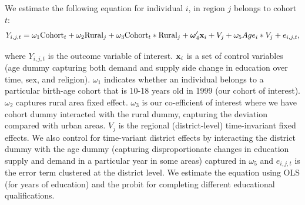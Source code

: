 \documentclass[12pt,letterpaper]{article}
\newcommand{\bfomega}{\ensuremath{\mbox{\boldmath $\omega$}}}
\newcommand{\bfx}{\ensuremath{\mbox{\bf x}}}
\newcommand{\0}{\ensuremath{\mbox{\boldmath $0$}}}
\begin{document}


We estimate the following equation for individual $i$, in region $j$ belongs to cohort $t$:
\begin{equation}
Y_{i,j,t} = \omega_{1}\textnormal{Cohort}_{t}+
\omega_{2}\textnormal{Rural}_{j}+ \omega_{3}\textnormal{Cohort}_{t}*\textnormal{Rural}_{j}+
\bfomega'_{4}\bfx_{i}+V_{j}+\omega_{5}Age_{i}*{V}_{j}+e_{i,j,t},
\label{longruneqn}
\end{equation}

where $Y_{i,j,t}$ is the outcome variable of interest. $\bfx_{i}$ is a set of control variables (age dummy capturing both demand and supply side change in education over time, sex, and religion). $\omega_{1}$ indicates whether an individual belongs to a particular birth-age cohort that is 10-18 years old in 1999 (our cohort of interest). $\omega_{2}$ captures rural area fixed effect. $\omega_{3}$ is our co-efficient of interest where we have cohort dummy interacted with the rural dummy, capturing the deviation compared with urban areas. $V_{j}$ is the regional (district-level) time-invariant fixed effects.  We also control for time-variant district effects by interacting the district dummy with the age dummy (capturing disproportionate changes in education supply and demand in a particular year in some areas) captured in $\omega_{5}$ and $e_{i,j,t}$ is the error term clustered at the district level. We estimate the equation using OLS (for years of education) and the probit for completing different educational qualifications. 
\end{document}

